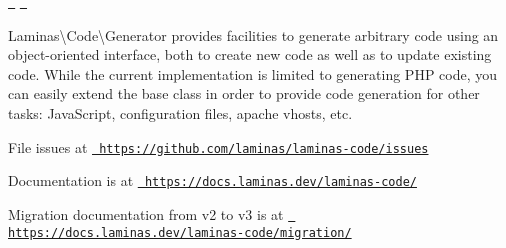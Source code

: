 \href{https://travis-ci.com/laminas/laminas-code}{\texttt{ }} \href{https://coveralls.io/github/laminas/laminas-code?branch=master}{\texttt{ }}

{\ttfamily Laminas\textbackslash{}Code\textbackslash{}Generator} provides facilities to generate arbitrary code using an object-\/oriented interface, both to create new code as well as to update existing code. While the current implementation is limited to generating PHP code, you can easily extend the base class in order to provide code generation for other tasks\+: Java\+Script, configuration files, apache vhosts, etc.


\begin{DoxyItemize}
\item File issues at \href{https://github.com/laminas/laminas-code/issues}{\texttt{ https\+://github.\+com/laminas/laminas-\/code/issues}}
\item Documentation is at \href{https://docs.laminas.dev/laminas-code/}{\texttt{ https\+://docs.\+laminas.\+dev/laminas-\/code/}}
\item Migration documentation from v2 to v3 is at \href{https://docs.laminas.dev/laminas-code/migration/}{\texttt{ https\+://docs.\+laminas.\+dev/laminas-\/code/migration/}} 
\end{DoxyItemize}